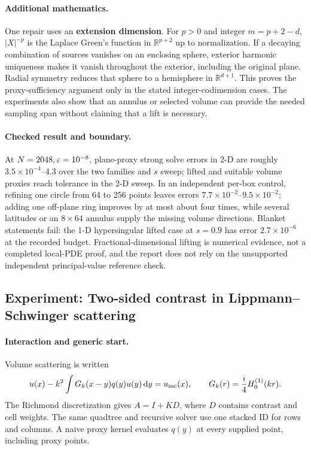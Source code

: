 \paragraph{Additional mathematics.} One repair uses an \textbf{extension dimension}. For $p>0$ and integer $m=p+2-d$, $|X|^{-p}$ is the Laplace Green's function in $\mathbb R^{p+2}$ up to normalization. If a decaying combination of sources vanishes on an enclosing sphere, exterior harmonic uniqueness makes it vanish throughout the exterior, including the original plane. Radial symmetry reduces that sphere to a hemisphere in $\mathbb R^{d+1}$. This proves the proxy-sufficiency argument only in the stated integer-codimension cases. The experiments also show that an annulus or selected volume can provide the needed sampling span without claiming that a lift is necessary.

\paragraph{Checked result and boundary.} At $N=2048,\varepsilon=10^{-8}$, plane-proxy strong solve errors in 2-D are roughly $3.5\times10^{-4}$--$4.3$ over the two families and $s$ sweep; lifted and suitable volume proxies reach tolerance in the 2-D sweep. In an independent per-box control, refining one circle from 64 to 256 points leaves errors $7.7\times10^{-2}$--$9.5\times10^{-2}$; adding one off-plane ring improves by at most about four times, while several latitudes or an $8\times64$ annulus supply the missing volume directions. Blanket statements fail: the 1-D hypersingular lifted case at $s=0.9$ has error $2.7\times10^{-6}$ at the recorded budget. Fractional-dimensional lifting is numerical evidence, not a completed local-PDE proof, and the report does not rely on the unsupported independent principal-value reference check.

\subsection{Experiment: Two-sided contrast in Lippmann--Schwinger scattering}
\label{exp:e9}
\paragraph{Interaction and generic start.} Volume scattering is written
\begin{equation}
 u(x)-k^2\int G_k(x-y)q(y)u(y)\,\mathrm dy=u_{\rm inc}(x),
 \qquad G_k(r)=\frac{i}{4}H_0^{(1)}(kr).
 \label{eq:ls}
\end{equation}
The Richmond discretization gives $A=I+KD$, where $D$ contains contrast and cell weights. The same quadtree and recursive solver use one stacked ID for rows and columns. A naive proxy kernel evaluates $q(y)$ at every supplied point, including proxy points.

